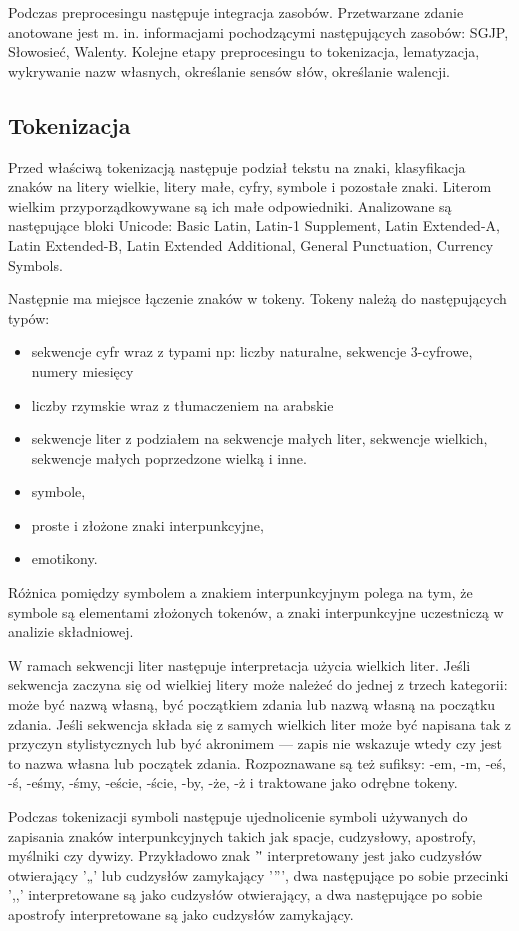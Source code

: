 \documentclass[oneside,pwrcover,withmarginpar,hidelinks,11pt]{article}
\begin{document}
Podczas preprocesingu następuje integracja zasobów.
Przetwarzane zdanie anotowane jest m. in. informacjami 
pochodzącymi następujących zasobów: SGJP, Słowosieć, Walenty. %
Kolejne etapy preprocesingu to tokenizacja, lematyzacja, wykrywanie nazw własnych, określanie sensów słów, określanie walencji.

\subsection{Tokenizacja}
Przed właściwą tokenizacją następuje podział tekstu na znaki, 
klasyfikacja znaków na litery wielkie, litery małe, cyfry, symbole i pozostałe znaki.
Literom wielkim przyporządkowywane są ich małe odpowiedniki.
Analizowane są następujące bloki Unicode: Basic Latin, Latin-1 Supplement, Latin Extended-A, Latin Extended-B, Latin Extended Additional, General Punctuation, Currency Symbols.

Następnie ma miejsce łączenie znaków w tokeny. Tokeny należą do następujących typów:
\begin{itemize}
\item sekwencje cyfr wraz z typami np: liczby naturalne, sekwencje 3-cyfrowe, numery miesięcy
\item liczby rzymskie wraz z tłumaczeniem na arabskie
\item sekwencje liter z podziałem na sekwencje małych liter, sekwencje wielkich, 
sekwencje małych poprzedzone wielką i inne.
\item symbole,
\item proste i złożone znaki interpunkcyjne,
\item emotikony.
\end{itemize}
Różnica pomiędzy symbolem a znakiem interpunkcyjnym polega na tym, że 
symbole są elementami złożonych tokenów, a znaki interpunkcyjne uczestniczą w analizie składniowej.

W ramach sekwencji liter następuje interpretacja użycia wielkich liter.
Jeśli sekwencja zaczyna się od wielkiej litery może należeć do jednej z trzech kategorii:
może być nazwą własną, być początkiem zdania lub nazwą własną na początku zdania.
Jeśli sekwencja składa się z samych wielkich liter może być 
napisana tak z przyczyn stylistycznych lub być akronimem --- 
zapis nie wskazuje wtedy czy jest to nazwa własna lub początek zdania.
Rozpoznawane są też sufiksy: -em, -m, -eś, -ś, -eśmy, -śmy, -eście, -ście, -by, -że, -ż i traktowane jako odrębne tokeny.

Podczas tokenizacji symboli następuje ujednolicenie symboli używanych do zapisania znaków interpunkcyjnych takich jak
spacje, cudzysłowy, apostrofy, myślniki czy dywizy.
Przykładowo znak '\"' interpretowany jest jako cudzysłów otwierający '„' lub cudzysłów zamykający '”',
dwa następujące po sobie przecinki ',,' interpretowane są jako cudzysłów otwierający,
a dwa następujące po sobie apostrofy interpretowane są jako cudzysłów zamykający.
\end{document}

